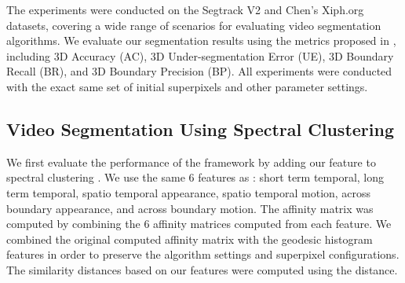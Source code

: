 \documentclass[runningheads]{llncs}
\begin{document}
The experiments were conducted on the Segtrack V2 \cite{SegTrackv2_dataset} and Chen's Xiph.org \cite{Chen_dataset} datasets, covering a wide range of scenarios for evaluating video segmentation algorithms. We evaluate our segmentation results using the metrics proposed in \cite{6247802}, including 3D Accuracy (AC), 3D Under-segmentation Error (UE), 3D Boundary Recall (BR), and 3D Boundary Precision (BP). All experiments were conducted with the exact same set of initial superpixels and other parameter settings.

\subsection{Video Segmentation Using Spectral Clustering}

We first evaluate the performance of the framework by adding our feature to spectral clustering  \cite{Galasso2013}. We use the same 6 features as  \cite{Galasso2013}: short term temporal, long term temporal, spatio temporal appearance, spatio temporal motion, across boundary appearance, and across boundary motion. The affinity matrix was computed by combining the 6 affinity matrices computed from each feature. We combined the original computed affinity matrix  with the geodesic histogram features in order to preserve the algorithm settings and superpixel configurations. The similarity distances based on our features were computed using the  distance.
\end{document}
